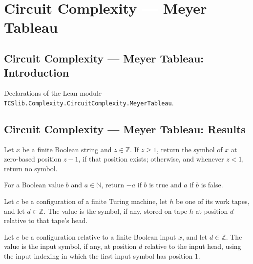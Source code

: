\section{Circuit Complexity --- Meyer Tableau}
\subsection*{Circuit Complexity --- Meyer Tableau: Introduction}

Declarations of the Lean module \texttt{TCSlib.Complexity.CircuitComplexity.MeyerTableau}.

\subsection*{Circuit Complexity --- Meyer Tableau: Results}

\begin{definition}
\label{Complexity.Meyer.xhat}
\leanok
Let $x$ be a finite Boolean string and $z\in\mathbb{Z}$. If $z\ge 1$, return the symbol
of $x$ at zero-based position $z-1$, if that position exists; otherwise, and whenever
$z<1$, return no symbol.
\end{definition}

\begin{definition}
\label{Complexity.Meyer.sgnZ}
\leanok
For a Boolean value $b$ and $a\in\mathbb{N}$, return $-a$ if $b$ is true and $a$ if $b$
is false.
\end{definition}

\begin{definition}
\label{Complexity.Meyer.RW}
\leanok
{}
Let $c$ be a configuration of a finite Turing machine, let $h$ be one of its work tapes,
and let $d\in\mathbb{Z}$. The value is the symbol, if any, stored on tape $h$ at
position $d$ relative to that tape’s head.
\end{definition}

\begin{definition}
\label{Complexity.Meyer.RI}
\leanok
{}
Let $c$ be a configuration relative to a finite Boolean input $x$, and let
$d\in\mathbb{Z}$. The value is the input symbol, if any, at position $d$ relative to the
input head, using the input indexing in which the first input symbol has position $1$.
\end{definition}

